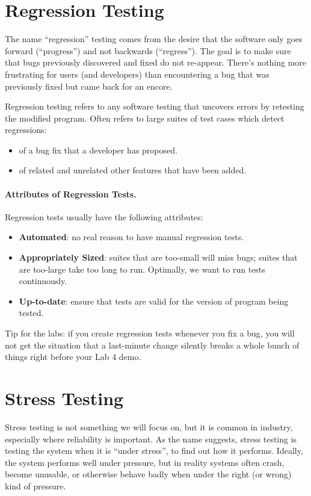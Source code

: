 





\section*{Regression Testing}

The name ``regression'' testing comes from the desire that the software only goes forward (``progress'') and not backwards (``regress''). The goal is to make sure that bugs previously discovered and fixed do not re-appear. There's nothing more frustrating for users (and developers) than encountering a bug that was previously fixed but came back for an encore.

Regression testing refers to any software testing that uncovers errors
by retesting the modified program. Often refers to large
suites of test cases which detect regressions:

\begin{itemize}
\item of a bug fix that a developer has proposed.
\item of related and unrelated other features that have been added.
\end{itemize}

\paragraph{Attributes of Regression Tests.}
Regression tests usually have the following attributes:

\begin{itemize}
\item \textbf{Automated}: no real reason to have manual regression tests.
\item \textbf{Appropriately Sized}: suites that are too-small will miss bugs; suites that are too-large take too long to run. Optimally, we want to run tests continuously.
\item \textbf{Up-to-date}: ensure that tests are valid for the version of program being tested.
\end{itemize}

Tip for the labs: if you create regression tests whenever you fix a bug, you will not get the situation that a last-minute change silently breaks a whole bunch of things right before your Lab 4 demo.

\section*{Stress Testing}
Stress testing is not something we will focus on, but it is common in industry, especially where reliability is important. As the name suggests, stress testing is testing the system when it is ``under stress'', to find out how it performs. Ideally, the system performs well under pressure, but in reality systems often crash, become unusable, or otherwise behave badly when under the right (or wrong) kind of pressure.


